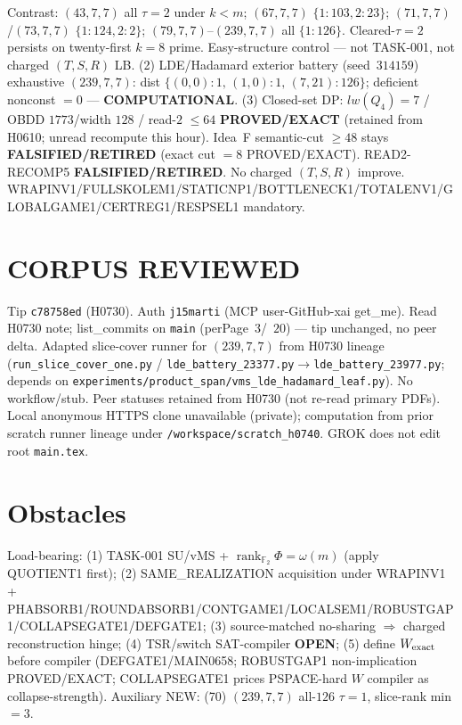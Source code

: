\documentclass[11pt]{article}
\begin{document}
Contrast: $(43,7,7)$ all $\tau{=}2$ under $k{<}m$; $(67,7,7)$ $\{1{:}103,2{:}23\}$;
$(71,7,7)$/$(73,7,7)$ $\{1{:}124,2{:}2\}$; $(79,7,7)$--$(239,7,7)$ all $\{1{:}126\}$.
Cleared-$\tau{=}2$ persists on twenty-first $k{=}8$ prime. Easy-structure control --- not TASK-001,
not charged $(T,S,R)$ LB.
(2) LDE/Hadamard exterior battery (seed~$314159$) exhaustive $(239,7,7)$:
dist $\{(0,0){:}1,\,(1,0){:}1,\,(7,21){:}126\}$; deficient nonconst $=0$ --- \textbf{COMPUTATIONAL}.
(3) Closed-set DP: $lw(Q_4)=7$ / OBDD $1773$/width $128$ / read-$2$ $\le64$
\textbf{PROVED/EXACT} (retained from H0610; unread recompute this hour).
Idea~F semantic-cut $\ge48$ stays \textbf{FALSIFIED/RETIRED} (exact cut $=8$ PROVED/EXACT).
READ2-RECOMP5 \textbf{FALSIFIED/RETIRED}. No charged $(T,S,R)$ improve.
WRAPINV1/FULLSKOLEM1/STATICNP1/BOTTLENECK1/TOTALENV1/GLOBALGAME1/CERTREG1/RESPSEL1 mandatory.

\section*{CORPUS REVIEWED}
Tip \texttt{c78758ed} (H0730). Auth \texttt{j15marti} (MCP user-GitHub-xai get\_me).
Read H0730 note; list\_commits on \texttt{main} (perPage~$3$/~$20$) --- tip unchanged, no peer delta.
Adapted slice-cover runner for $(239,7,7)$ from H0730 lineage
(\texttt{run\_slice\_cover\_one.py} / \texttt{lde\_battery\_23377.py}$\to$\texttt{lde\_battery\_23977.py};
depends on \texttt{experiments/product\_span/vms\_lde\_hadamard\_leaf.py}).
No workflow/stub. Peer statuses retained from H0730 (not re-read primary PDFs).
Local anonymous HTTPS clone unavailable (private);
computation from prior scratch runner lineage under \texttt{/workspace/scratch\_h0740}.
GROK does not edit root \texttt{main.tex}.

\section*{Obstacles}
Load-bearing: (1) TASK-001 SU/vMS + $\operatorname{rank}_{\mathbb F_2}\Phi=\omega(m)$ (apply QUOTIENT1 first);
(2) SAME\_REALIZATION acquisition under WRAPINV1 + PHABSORB1/ROUNDABSORB1/CONTGAME1/LOCALSEM1/ROBUSTGAP1/COLLAPSEGATE1/DEFGATE1;
(3) source-matched no-sharing $\Rightarrow$ charged reconstruction hinge;
(4) TSR/switch SAT-compiler \textbf{OPEN};
(5) define $W_{\rm exact}$ before compiler (DEFGATE1/MAIN0658; ROBUSTGAP1 non-implication PROVED/EXACT;
COLLAPSEGATE1 prices PSPACE-hard $W$ compiler as collapse-strength).
Auxiliary NEW: (70) $(239,7,7)$ all-$126$ $\tau{=}1$, slice-rank min $=3$.
\end{document}
